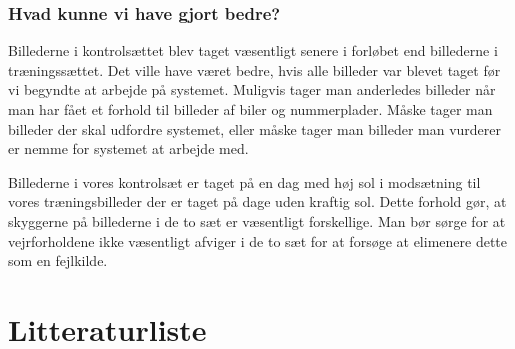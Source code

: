 \documentclass[11pt,a4paper,final]{article}
\begin{document}
\subsubsection*{Hvad kunne vi have gjort bedre?}
Billederne i kontrolsættet blev taget væsentligt senere i forløbet end billederne i træningssættet. Det ville have været bedre, hvis alle billeder var blevet taget før vi begyndte at arbejde på systemet. Muligvis tager man anderledes billeder når man har fået et forhold til billeder af biler og nummerplader. Måske tager man billeder der skal udfordre systemet, eller måske tager man billeder man vurderer er nemme for systemet at arbejde med.

Billederne i vores kontrolsæt er taget på en dag med høj sol i modsætning til vores træningsbilleder der er taget på dage uden kraftig sol. Dette forhold gør, at skyggerne på billederne i de to sæt er væsentligt forskellige. Man bør sørge for at vejrforholdene ikke væsentligt afviger i de to sæt for at forsøge at elimenere dette som en fejlkilde.






\newpage %
\section{Litteraturliste}
\end{document}
